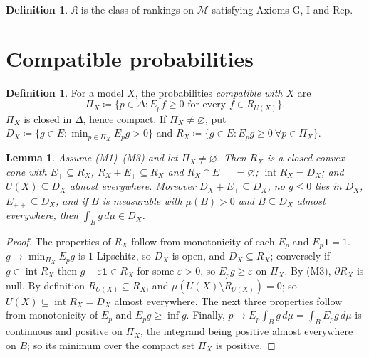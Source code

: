 \documentclass[11pt]{article}
\newtheorem{lemma}[theorem]{Lemma}
\theoremstyle{definition}
\newtheorem{definition}[theorem]{Definition}
\theoremstyle{remark}
\newcommand{\M}{\mathcal M}
\newcommand{\K}{\mathfrak K}
\newcommand{\one}{\mathbf 1}
\newcommand{\interior}{\operatorname{int}}
\newcommand{\bd}{\partial}
\begin{document}
\begin{definition}\label{def:class}
$\K$ is the class of rankings on $\M$ satisfying Axioms G, I and Rep.
\end{definition}

\section{Compatible probabilities}\label{sec:compatible}

\begin{definition}\label{def:compatible}
For a model $X$, the probabilities \emph{compatible with $X$} are
\[
\Pi_X\coloneqq\{p\in\Delta:E_pf\ge0\text{ for every }f\in R_{U(X)}\}.
\]
$\Pi_X$ is closed in $\Delta$, hence compact. If $\Pi_X\ne\varnothing$, put $D_X\coloneqq\{g\in E:\min_{p\in\Pi_X}E_pg>0\}$ and $R_X\coloneqq\{g\in E:E_pg\ge0\ \forall p\in\Pi_X\}$.
\end{definition}

\begin{lemma}\label{lem:DX}
Assume (M1)--(M3) and let $\Pi_X\ne\varnothing$. Then $R_X$ is a closed convex cone with $E_+\subseteq R_X$, $R_X+E_+\subseteq R_X$ and $R_X\cap E_{--}=\varnothing$; $\interior R_X=D_X$; and $U(X)\subseteq D_X$ almost everywhere. Moreover $D_X+E_+\subseteq D_X$, no $g\le0$ lies in $D_X$, $E_{++}\subseteq D_X$, and if $B$ is measurable with $\mu(B)>0$ and $B\subseteq D_X$ almost everywhere, then $\int_Bg\,d\mu\in D_X$.
\end{lemma}
\begin{proof}
The properties of $R_X$ follow from monotonicity of each $E_p$ and $E_p\one=1$. $g\mapsto\min_{\Pi_X}E_pg$ is $1$-Lipschitz, so $D_X$ is open, and $D_X\subseteq R_X$; conversely if $g\in\interior R_X$ then $g-\varepsilon\one\in R_X$ for some $\varepsilon>0$, so $E_pg\ge\varepsilon$ on $\Pi_X$. By (M3), $\bd R_X$ is null. By definition $R_{U(X)}\subseteq R_X$, and $\mu(U(X)\setminus R_{U(X)})=0$; so $U(X)\subseteq\interior R_X=D_X$ almost everywhere. The next three properties follow from monotonicity of $E_p$ and $E_pg\ge\inf g$. Finally, $p\mapsto E_p\int_Bg\,d\mu=\int_BE_pg\,d\mu$ is continuous and positive on $\Pi_X$, the integrand being positive almost everywhere on $B$; so its minimum over the compact set $\Pi_X$ is positive.
\end{proof}
\end{document}
